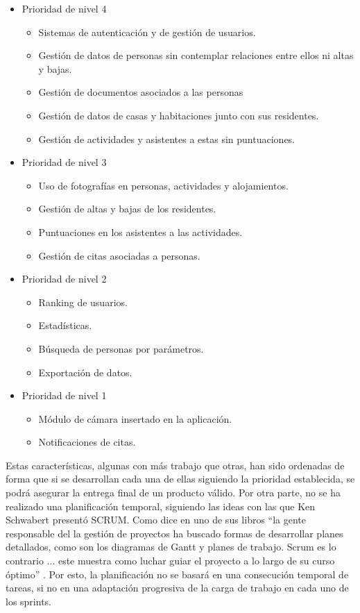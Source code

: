 \begin{itemize}
    \item Prioridad de nivel 4
    \begin{itemize}
        \item Sistemas de autenticación y de gestión de usuarios.
        \item Gestión de datos de personas sin contemplar relaciones entre ellos ni altas y bajas.
        \item Gestión de documentos asociados a las personas
        \item Gestión de datos de casas y habitaciones junto con sus residentes.
        \item Gestión de actividades y asistentes a estas sin puntuaciones.
    \end{itemize}
    \item Prioridad de nivel 3
    \begin{itemize}
        \item Uso de fotografías en personas, actividades y alojamientos.
        \item Gestión de altas y bajas de los residentes.
        \item Puntuaciones en los asistentes a las actividades.
        \item Gestión de citas asociadas a personas.
    \end{itemize}
    \item Prioridad de nivel 2
    \begin{itemize}
        \item Ranking de usuarios.
        \item Estadísticas.
        \item Búsqueda de personas por parámetros.
        \item Exportación de datos.
    \end{itemize}
    \item Prioridad de nivel 1
    \begin{itemize}
        \item Módulo de cámara insertado en la aplicación.
        \item Notificaciones de citas. 
    \end{itemize}
\end{itemize}

Estas características, algunas con más trabajo que otras, han sido ordenadas de forma que si se desarrollan cada una de ellas siguiendo la prioridad establecida, se podrá asegurar la entrega final de un producto válido. Por otra parte, no se ha realizado una planificación temporal, siguiendo las ideas con las que Ken Schwabert presentó SCRUM. Como dice en uno de sus libros ``la gente responsable del la gestión de proyectos ha buscado formas de desarrollar planes detallados, como son los diagramas de Gantt y planes de trabajo. Scrum es lo contrario {...} este muestra como luchar guiar el proyecto a lo largo de su curso óptimo'' \cite[p.~xvii]{schwaber2004agile}. Por esto, la planificación no se basará en una consecución temporal de tareas, si no en una adaptación progresiva de la carga de trabajo en cada uno de los sprints.


